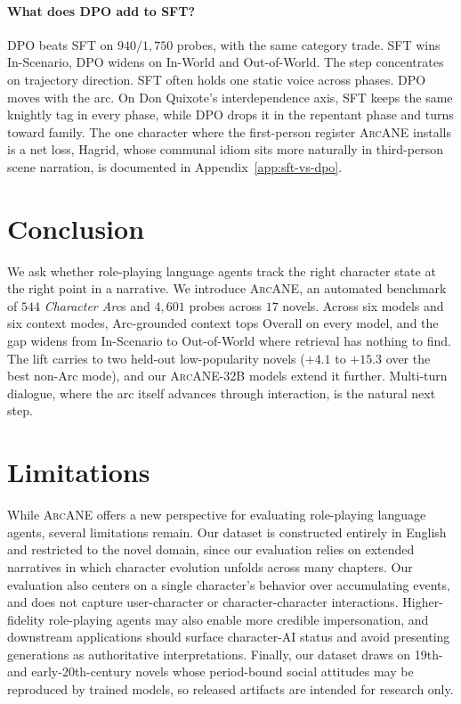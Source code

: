 \documentclass[11pt]{article}
\newcommand{\ours}{\textsc{ArcANE}}
\begin{document}
\paragraph{What does DPO add to SFT?}
\label{sec:compare_sft_dpo}
DPO beats SFT on $940/1{,}750$ probes, %
with the same category trade. SFT wins In-Scenario, DPO widens on In-World and Out-of-World. The step concentrates on trajectory direction. SFT often holds one static voice across phases. DPO moves with the arc. On Don Quixote's interdependence axis, SFT keeps the same knightly tag in every phase, while DPO drops it in the repentant phase and turns toward family. The one character where the first-person register \ours{} installs is a net loss, Hagrid, whose communal idiom sits more naturally in third-person scene narration, is documented in Appendix~\ref{app:sft-vs-dpo}.

\section{Conclusion\label{sec:conclusion}}
We ask whether role-playing language agents track the right character state at the right point in a narrative. We introduce \ours{}, an automated benchmark of $544$ \emph{Character Arc}s and $4{,}601$ probes across $17$ novels. %
Across six models and six context modes, Arc-grounded context tops Overall on every model, and the gap widens from In-Scenario to Out-of-World where retrieval has nothing to find. The lift carries to two held-out low-popularity novels ($+4.1$ to $+15.3$ over the best non-Arc mode), and our \ours{}-32B models extend it further. Multi-turn dialogue, where the arc itself advances through interaction, is the natural next step.
\section*{Limitations\label{sec:limitations}}
While \ours{} offers a new perspective for evaluating role-playing language agents, several limitations remain. Our dataset is constructed entirely in English and restricted to the novel domain, since our evaluation relies on extended narratives in which character evolution unfolds across many chapters. Our evaluation also centers on a single character's behavior over accumulating events, and does not capture user-character or character-character interactions. Higher-fidelity role-playing agents may also enable more credible impersonation, and downstream applications should surface character-AI status and avoid presenting generations as authoritative interpretations. Finally, our dataset draws on 19th- and early-20th-century novels whose period-bound social attitudes may be reproduced by trained models, so released artifacts are intended for research only.
\end{document}
